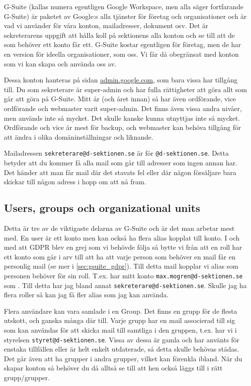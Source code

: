 \documentclass[../testamente_sekreterare_21-22.tex]{subfiles}
\begin{document}
G-Suite (kallas numera egentligen Google Workspace, men alla säger fortfarande G-Suite) är paketet av Google:s alla tjänster för företag och organisationer och är vad vi använder för våra konton, mailadresser, dokument osv. Det är sekreterarens uppgift att hålla koll på sektionens alla konton och se till att de som behöver ett konto får ett. G-Suite kostar egentligen för företag, men de har en version för ideella organisationer, som oss. Vi får då obegränsat med konton som vi kan skapa och använda oss av.

Dessa konton hanteras på sidan \url{admin.google.com}, som bara vissa har tillgång till. Du som sekreterare är super-admin och har fulla rättigheter att göra allt som går att göra på G-Suite. Mitt år (och året innan) så har även ordförande, vice ordförande och webmaster varit super-admin. Det finns även vissa andra nivåer, men används inte så mycket. Det skulle kanske kunna utnyttjas inte så mycket. Ordförande och vice är mest för backup, och webmaster kan behöva tillgång för att ändra i olika domäninställningar och liknande.

Mailadressen \texttt{sekreterare@d-sektionen.se} är  för \texttt{@d-sektionen.se}. Detta betyder att du kommer få alla mail som går till adresser som ingen annan har. Det händer att man får mail där det stavats fel eller där någon försäljare bara skickar till någon adress i hopp om att nå fram.

\subsection{Users, groups och organizational units}
Detta är tre av de viktigaste delarna av G-Suite och är det man arbetar mest med. En user är ett konto men kan också ha flera alias kopplat till konto. I och med att GDPR blev en grej som vi behövde följa så bytte vi från att en roll har ett konto som går i arv till att ha att varje person som behöver en mail får en personlig mail (se mer i \cref{sec:gsuite_gdpr}). Till detta mail kopplar vi alias som personen behöver för sin roll. T.ex. har mitt konto \texttt{max.mogren@d-sektionen.se} som . Till detta har jag bland annat \texttt{sekreterare@d-sektionen.se}. Skulle jag ha flera roller så kan jag få fler alias som jag kan använda.

Flera användare kan vara samlade i en Group. Det finns en grupp för de flesta utskott, och ganska många där till. Varje grupp har en mail associerad till sig som kan användas för att skicka mail till samtliga i den gruppen, t.ex. har vi i styrelsen \texttt{styret@d-sektionen.se}. Vissa av dessa är gamla och har använts för enstaka tillfällen eller är helt enkelt utdaterade, så detta skulle behövas städas.  Det går även att ha grupper i andra grupper, vilket kan förenkla ibland. När du skapar konton så behöver du då alltså se till att hen också läggs till i rätt grupp/grupper.
\end{document}
